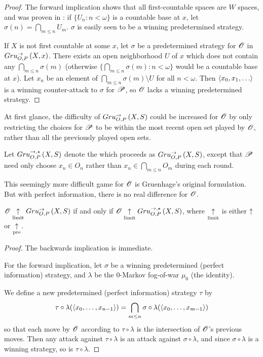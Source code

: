 \begin{proof}
  The forward implication shows that all first-countable spaces are $W$ spaces,
  and was proven in \cite{MR0413049}: if $\{U_n:n<\omega\}$ is a countable
  base at $x$, let $\sigma(n)=\bigcap_{m\leq n} U_m$. $\sigma$ is easily seen
  to be a winning predetermined strategy.

  If $X$ is not first countable at some $x$, let $\sigma$ be a
  predetermined strategy for $\mathscr{O}$ in $Gru_{O,P}^{\to}\left({X},{x}\right)$. There exists
  an open neighborhood $U$ of $x$ which does not contain any
  $\bigcap_{m\leq n}\sigma(m)$ (otherwise
  $\{\bigcap_{m\leq n}\sigma(m):n<\omega\}$ would be a countable base at $x$).
  Let $x_n$ be an element of $\bigcap_{m\leq n}\sigma(m)\setminus U$ for all
  $n<\omega$. Then $\<x_0,x_1,\dots\>$ is a winning counter-attack to $\sigma$
  for $\mathscr{P}$, so $\mathscr{O}$ lacks a winning predetermined strategy.
\end{proof}

At first glance, the difficulty of $Gru_{O,P}^{\to}\left({X},{S}\right)$ could be increased for
$\mathscr{O}$ by only restricting the choices for $\mathscr{P}$ to be within the most
recent open set played by $\mathscr{O}$, rather than all the previously played
open sets.

\begin{defn}
  Let $Gru_{O,P}^{\to,\star}\left({X},{S}\right)$ denote the  which
  proceeds as $Gru_{O,P}^{\to}\left({X},{S}\right)$, except that $\mathscr{P}$ need only choose
  $x_n\in O_n$ rather than $x_n\in \bigcap_{m\leq n}O_m$ during each round.
\end{defn}

This seemingly more difficult game for $\mathscr{O}$ is Gruenhage's original
formulation. But with perfect information, there is no real difference for
$\mathscr{O}$.

\begin{prop}\label{propNormalHardCon}
  $\mathscr{O} \underset{\text{limit}}{\uparrow} Gru_{O,P}^{\to}\left({X},{S}\right)$
    if and only if
  $\mathscr{O} \underset{\text{limit}}{\uparrow} Gru_{O,P}^{\to,\star}\left({X},{S}\right)$,
  where $\underset{\text{limit}}{\uparrow}$ is either $\uparrow$ or $\underset{\text{pre}}{\uparrow}$.
\end{prop}

\begin{proof}
  The backwards implication is immediate.

  For the forward implication, let $\sigma$ be a winning predetermined
  (perfect information) strategy, and $\lambda$ be the $0$-Markov
  fog-of-war $\mu_0$ (the identity).

  We define a new predetermined (perfect information) strategy $\tau$ by
    \[
      \tau\circ\lambda(\langle x_0,\dots,x_{n-1}\rangle)
        =
      \bigcap_{m\leq n}\sigma\circ\lambda(\langle x_0,\dots,x_{m-1}\rangle)
    \]
  so that each move by $\mathscr{O}$ according to $\tau\circ\lambda$ is the
  intersection of $\mathscr{O}$'s previous moves. Then any attack against
  $\tau\circ\lambda$ is an attack against $\sigma\circ\lambda$, and since
  $\sigma\circ\lambda$ is a winning strategy, so is $\tau\circ\lambda$.
\end{proof}

